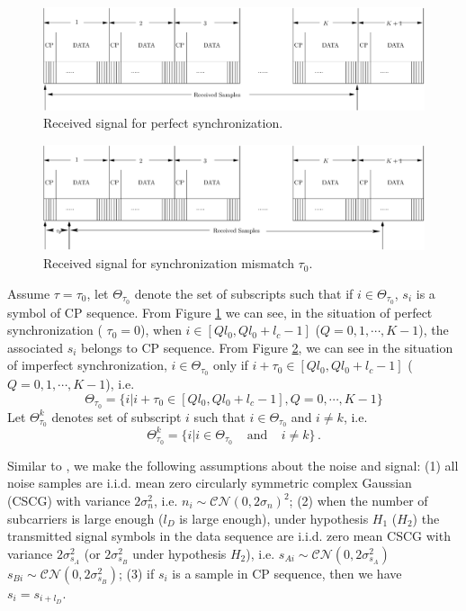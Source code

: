 \begin{figure}[!t]
  \centering 
  \includegraphics[width=\textwidth]{4/fig2.eps}
  \caption{Received signal for perfect synchronization.}
  \label{pic:1222ext0}
\end{figure}

\begin{figure}[!t]
  \centering 
  \includegraphics[width=\textwidth]{4/fig3.eps}
  \caption{Received signal for synchronization mismatch $\tau_0$.}
  \label{pic:1222a2}
\end{figure}
Assume $\tau = \tau_0$, let $\Theta_{\tau_0}$ denote the set of subscripts such that if $i \in \Theta_{\tau_0}$,  $s_i$ is a symbol of CP sequence. From Figure \ref{pic:1222ext0} we can see, in the situation of perfect synchronization ( $\tau_0 =0$), when $i \in [Ql_0, Ql_0+l_c-1]$ ($Q = 0, 1, \cdots, K-1$), the associated $s_i$ belongs to CP sequence. 
From Figure \ref{pic:1222a2}, we can see in the situation of imperfect synchronization, $i \in \Theta_{\tau_0}$ only if $i + \tau_0 \in [Ql_0, Ql_0+l_c -1]$ ($Q = 0, 1, \cdots, K-1$), i.e.
\begin{equation}
  \Theta_{\tau_0} = \{
i | i + \tau_0 \in [Ql_0, Ql_0+l_c -1], Q = 0, \cdots, K-1
  \}
\end{equation}
Let $\Theta_{\tau_0}^k$ denotes set of subscript $i$ such that  $i \in \Theta_{\tau_0}$ and $i \neq k$, i.e.
\begin{equation}
  \Theta_{\tau_0}^k =  \{i | i \in \Theta_{\tau_0} \;\;\;\; \text{and}\;\;\;\; i\neq k\}\,.
  \label{definitionoftau0k}
\end{equation}

Similar to \cite{axell2011optimal}, we make the following assumptions about the noise and signal: (1) all noise samples are i.i.d. mean zero circularly symmetric complex Gaussian (CSCG) with variance $2\sigma_n^2$, i.e. $n_i \sim \mathcal{CN}(0, 2\sigma_n)^2$; (2) when the number of subcarriers is large enough ($l_D$ is large enough), under hypothesis $H_1$ ($H_2$) the transmitted signal symbols in the data sequence are i.i.d. zero mean CSCG with variance $2\sigma_{s_A}^2$ (or $2\sigma_{s_B}^2$ under hypothesis $H_2$), i.e. $s_{Ai} \sim \mathcal{CN}(0, 2\sigma_{s_A}^2)$ $s_{Bi} \sim \mathcal{CN}(0, 2\sigma_{s_B}^2)$; (3) if $s_i$ is a sample in CP sequence, then we have $s_i = s_{i+l_D}$. 


